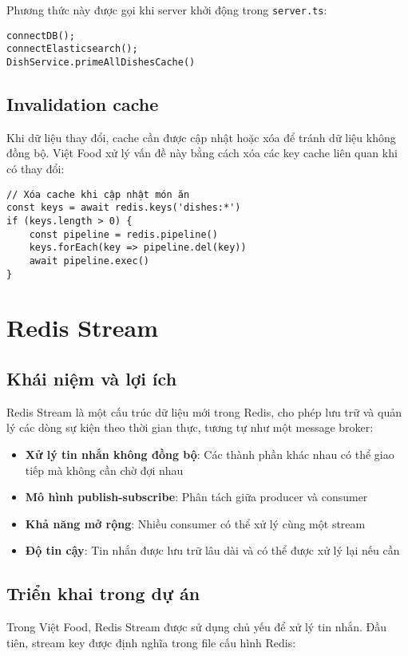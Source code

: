Phương thức này được gọi khi server khởi động trong \texttt{server.ts}:

\begin{verbatim}
connectDB();
connectElasticsearch();
DishService.primeAllDishesCache()
\end{verbatim}

\subsection{Invalidation cache}
Khi dữ liệu thay đổi, cache cần được cập nhật hoặc xóa để tránh dữ liệu không đồng bộ. Việt Food xử lý vấn đề này bằng cách xóa các key cache liên quan khi có thay đổi:

\begin{verbatim}
// Xóa cache khi cập nhật món ăn
const keys = await redis.keys('dishes:*')
if (keys.length > 0) {
    const pipeline = redis.pipeline()
    keys.forEach(key => pipeline.del(key))
    await pipeline.exec()
}
\end{verbatim}

\section{Redis Stream}

\subsection{Khái niệm và lợi ích}
Redis Stream là một cấu trúc dữ liệu mới trong Redis, cho phép lưu trữ và quản lý các dòng sự kiện theo thời gian thực, tương tự như một message broker:

\begin{itemize}
    \item \textbf{Xử lý tin nhắn không đồng bộ}: Các thành phần khác nhau có thể giao tiếp mà không cần chờ đợi nhau
    \item \textbf{Mô hình publish-subscribe}: Phân tách giữa producer và consumer
    \item \textbf{Khả năng mở rộng}: Nhiều consumer có thể xử lý cùng một stream
    \item \textbf{Độ tin cậy}: Tin nhắn được lưu trữ lâu dài và có thể được xử lý lại nếu cần
\end{itemize}

\subsection{Triển khai trong dự án}
Trong Việt Food, Redis Stream được sử dụng chủ yếu để xử lý tin nhắn. Đầu tiên, stream key được định nghĩa trong file cấu hình Redis:

